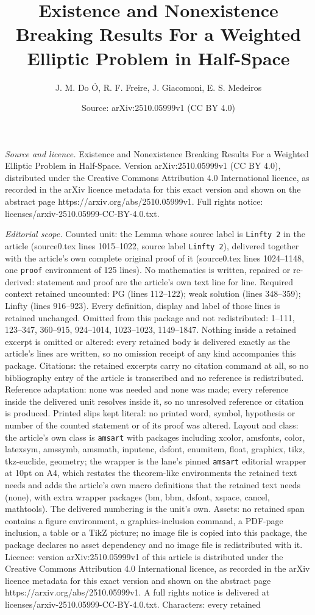 \documentclass[10pt,a4paper]{amsart}
\title[Existence and Nonexistence Breaking Results For a Weighted E]{Existence and Nonexistence Breaking Results For a Weighted Elliptic Problem in Half-Space}
\author{J. M. Do \'O, R. F. Freire, J. Giacomoni, E. S. Medeiros}
\date{Source: arXiv:2510.05999v1 (CC BY 4.0)}
\begin{document}
\maketitle

\noindent\emph{Source and licence.} Existence and Nonexistence Breaking Results For a Weighted Elliptic Problem in Half-Space. Version arXiv:2510.05999v1 (CC BY 4.0), distributed under the Creative Commons Attribution 4.0 International licence, as recorded in the arXiv licence metadata for this exact version and shown on the abstract page https://arxiv.org/abs/2510.05999v1. Full rights notice: licenses/arxiv-2510.05999-CC-BY-4.0.txt.\par\smallskip

\noindent\textit{Editorial scope.} Counted unit: the Lemma whose source label is \texttt{Linfty 2} in the article (source0.tex lines 1015--1022, source label \texttt{Linfty 2}), delivered together with the article's own complete original proof of it (source0.tex lines 1024--1148, one \texttt{proof} environment of 125 lines). No mathematics is written, repaired or re-derived: statement and proof are the article's own text line for line. Required context retained uncounted: PG (lines 112--122); weak solution (lines 348--359); Linfty (lines 916--923). Every definition, display and label of those lines is retained unchanged. Omitted from this package and not redistributed: 1--111, 123--347, 360--915, 924--1014, 1023--1023, 1149--1847. Nothing inside a retained excerpt is omitted or altered: every retained body is delivered exactly as the article's lines are written, so no omission receipt of any kind accompanies this package. Citations: the retained excerpts carry no citation command at all, so no bibliography entry of the article is transcribed and no reference is redistributed. Reference adaptation: none was needed and none was made; every reference inside the delivered unit resolves inside it, so no unresolved reference or citation is produced. Printed slips kept literal: no printed word, symbol, hypothesis or number of the counted statement or of its proof was altered. Layout and class: the article's own class is \texttt{amsart} with packages including xcolor, amsfonts, color, latexsym, amssymb, amsmath, inputenc, dsfont, enumitem, float, graphicx, tikz, tkz-euclide, geometry; the wrapper is the lane's pinned \texttt{amsart} editorial wrapper at 10pt on A4, which restates the theorem-like environments the retained text needs and adds the article's own macro definitions that the retained text needs (none), with extra wrapper packages (bm, bbm, dsfont, xspace, cancel, mathtools). The delivered numbering is the unit's own. Assets: no retained span contains a figure environment, a graphics-inclusion command, a PDF-page inclusion, a table or a TikZ picture; no image file is copied into this package, the package declares no asset dependency and no image file is redistributed with it. Licence: version arXiv:2510.05999v1 of this article is distributed under the Creative Commons Attribution 4.0 International licence, as recorded in the arXiv licence metadata for this exact version and shown on the abstract page https://arxiv.org/abs/2510.05999v1. A full rights notice is delivered at licenses/arxiv-2510.05999-CC-BY-4.0.txt. Characters: every retained 
\end{document}

